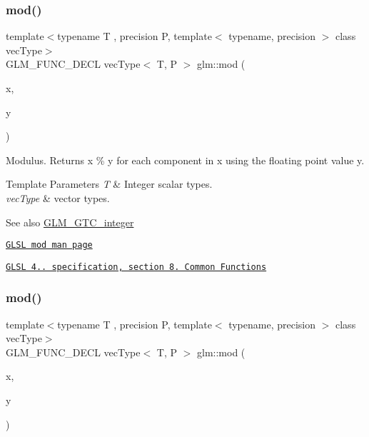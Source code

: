 \subsubsection{\texorpdfstring{mod()}{mod()}\hspace{0.1cm}{\footnotesize\ttfamily [2/3]}}
{\footnotesize\ttfamily template$<$typename T , precision P, template$<$ typename, precision $>$ class vec\+Type$>$ \\
G\+L\+M\+\_\+\+F\+U\+N\+C\+\_\+\+D\+E\+CL vec\+Type$<$ T, P $>$ glm\+::mod (\begin{DoxyParamCaption}\item[{vec\+Type$<$ T, P $>$ const \&}]{x,  }\item[{T}]{y }\end{DoxyParamCaption})}

Modulus. Returns x \% y for each component in x using the floating point value y.


\begin{DoxyTemplParams}{Template Parameters}
{\em T} & Integer scalar types. \\
\hline
{\em vec\+Type} & vector types.\\
\hline
\end{DoxyTemplParams}
\begin{DoxySeeAlso}{See also}
\hyperlink{group__gtc__integer}{G\+L\+M\+\_\+\+G\+T\+C\+\_\+integer} 

\href{http://www.opengl.org/sdk/docs/manglsl/xhtml/mod.xml}{\tt G\+L\+SL mod man page} 

\href{http://www.opengl.org/registry/doc/GLSLangSpec.4.20.8.pdf}{\tt G\+L\+SL 4.. specification, section 8. Common Functions} 
\end{DoxySeeAlso}
\mbox{\label{group__gtc__integer_ga689e2d9100af0bfc4d9954c96221095e}} 
\subsubsection{\texorpdfstring{mod()}{mod()}\hspace{0.1cm}{\footnotesize\ttfamily [3/3]}}
{\footnotesize\ttfamily template$<$typename T , precision P, template$<$ typename, precision $>$ class vec\+Type$>$ \\
G\+L\+M\+\_\+\+F\+U\+N\+C\+\_\+\+D\+E\+CL vec\+Type$<$ T, P $>$ glm\+::mod (\begin{DoxyParamCaption}\item[{vec\+Type$<$ T, P $>$ const \&}]{x,  }\item[{vec\+Type$<$ T, P $>$ const \&}]{y }\end{DoxyParamCaption})}

